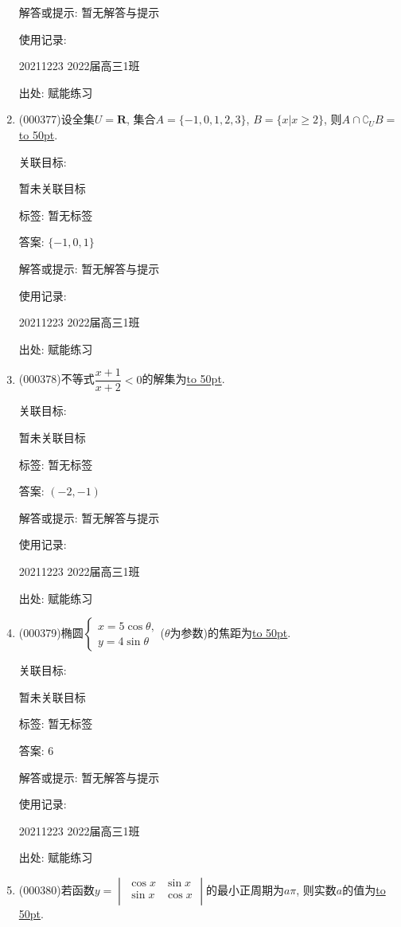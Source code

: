 \documentclass[10pt,a4paper]{article}
\newcommand{\blank}[1]{\underline{\hbox to #1pt{}}}
\begin{document}
\begin{enumerate}[1.]
解答或提示: 暂无解答与提示

使用记录:

20211223	2022届高三1班	


出处: 赋能练习
\item { (000377)}设全集$U=\mathbf{R}$, 集合$A=\{-1,0,1,2,3\}$, $B=\{x|x\ge 2\}$, 则$A\cap {\complement_U}B=$\blank{50}.


关联目标:

暂未关联目标



标签: 暂无标签

答案: $\{-1,0,1\}$

解答或提示: 暂无解答与提示

使用记录:

20211223	2022届高三1班	


出处: 赋能练习
\item { (000378)}不等式$\dfrac{x+1}{x+2}<0$的解集为\blank{50}.


关联目标:

暂未关联目标



标签: 暂无标签

答案: $(-2,-1)$

解答或提示: 暂无解答与提示

使用记录:

20211223	2022届高三1班	


出处: 赋能练习
\item { (000379)}椭圆$\begin{cases} x=5\cos \theta,  \\ y=4\sin \theta  \end{cases}$($\theta$为参数)的焦距为\blank{50}.


关联目标:

暂未关联目标



标签: 暂无标签

答案: $6$

解答或提示: 暂无解答与提示

使用记录:

20211223	2022届高三1班	


出处: 赋能练习
\item { (000380)}若函数$y=\begin{vmatrix}   \cos x & \sin x  \\   \sin x & \cos x  \\ \end{vmatrix}$的最小正周期为$a\pi $, 则实数$a$的值为\blank{50}.



\end{enumerate}
\end{document}
